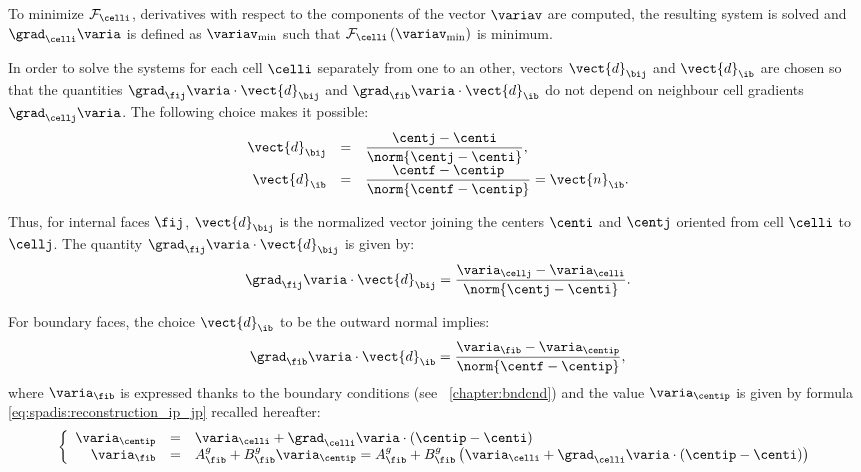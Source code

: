 To minimize $\mathcal{F}_{\celli}$, derivatives with respect to the components of the
vector $\variav  $ are computed, the resulting system is solved and $\grad_{\celli} \varia$ is defined
as $\variav_{\min}$ such that $\mathcal{F}_{\celli} \left( \variav_{\min}\right)$ is minimum.

In order to solve the systems for each cell $\celli$ separately from one to an other,
vectors $\vect{d}_{\bij}$ and $\vect{d}_\ib$ are chosen so that the quantities
$\grad_{\fij} \varia   \cdot \vect{d}_{\bij} $ and $\grad_{\fib} \varia   \cdot \vect{d}_\ib $
do not depend on neighbour cell gradients  $\grad_{\cellj} \varia $.
The following choice makes it possible:
\begin{equation}\label{eq:spadis:gradmc_scalar_d_choice}
\begin{array}{r c l}
\vect{d}_{\bij} &=& \dfrac{\centj - \centi}{\norm{\centj - \centi}}, \\
\vect{d}_\ib &=& \dfrac{\centf - \centip}{\norm{\centf - \centip}}= \vect{n}_\ib .
\end{array}
\end{equation}

Thus, for internal faces $\fij$, $\vect{d}_{\bij}$ is the normalized vector joining
the centers $\centi$ and $\centj$ oriented from cell $\celli$ to $\cellj$.
The quantity  $\grad_{\fij} \varia   \cdot \vect{d}_{\bij}$ is given by:
\begin{equation}
\grad_{\fij} \varia   \cdot \vect{d}_{\bij} =\dfrac{\varia_{\cellj} - \varia_{\celli} }{\norm{\centj - \centi}}.
\end{equation}

For boundary faces, the choice $\vect{d}_\ib$ to be the outward normal implies:
\begin{equation}
\grad_{\fib} \varia   \cdot \vect{d}_\ib =\dfrac{\varia_{\fib} - \varia_{\centip} }{\norm{\centf - \centip}},
\end{equation}
where $\varia_{\fib}$ is expressed thanks to the boundary conditions (see \chaptername~\ref{chapter:bndcnd}) and
the value $\varia_{\centip} $ is given by formula \eqref{eq:spadis:reconstruction_ip_jp} recalled hereafter:
%
\begin{equation}\label{eq:spadis:gradmc_bound_value}
\left\{\begin{array}{r c l}
\varia_{\centip} &=&\varia_{\celli} +\grad_{\celli} \varia \cdot \left(\centip - \centi\right)\\
\varia_{\fib} &=& A^g_{\fib} +B^g_{\fib} \varia_{\centip} = A^g_{\fib} +B^g_{\fib} \left( \varia_{\celli} +  \grad_{\celli} \varia \cdot \left(\centip - \centi\right) \right)
\end{array}\right.
\end{equation}

